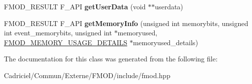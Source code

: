 \begin{DoxyCompactItemize}
\item 
F\+M\+O\+D\+\_\+\+R\+E\+S\+U\+LT F\+\_\+\+A\+PI {\bfseries get\+User\+Data} (void $\ast$$\ast$userdata)\hypertarget{class_f_m_o_d_1_1_system_a04c439bfbbfa385ce819b29b26584fc5}{}\label{class_f_m_o_d_1_1_system_a04c439bfbbfa385ce819b29b26584fc5}

\item 
F\+M\+O\+D\+\_\+\+R\+E\+S\+U\+LT F\+\_\+\+A\+PI {\bfseries get\+Memory\+Info} (unsigned int memorybits, unsigned int event\+\_\+memorybits, unsigned int $\ast$memoryused, \hyperlink{struct_f_m_o_d___m_e_m_o_r_y___u_s_a_g_e___d_e_t_a_i_l_s}{F\+M\+O\+D\+\_\+\+M\+E\+M\+O\+R\+Y\+\_\+\+U\+S\+A\+G\+E\+\_\+\+D\+E\+T\+A\+I\+LS} $\ast$memoryused\+\_\+details)\hypertarget{class_f_m_o_d_1_1_system_a248a17e258aa12ccc32c85c7a5a4f64c}{}\label{class_f_m_o_d_1_1_system_a248a17e258aa12ccc32c85c7a5a4f64c}

\end{DoxyCompactItemize}


The documentation for this class was generated from the following file\+:\begin{DoxyCompactItemize}
\item 
Cadriciel/\+Commun/\+Externe/\+F\+M\+O\+D/include/fmod.\+hpp\end{DoxyCompactItemize}
